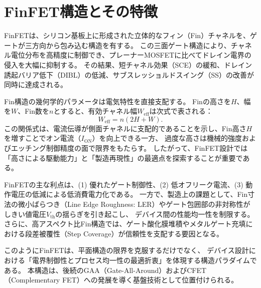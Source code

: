 \section{FinFET構造とその特徴}
FinFETは、シリコン基板上に形成された立体的なフィン（Fin）チャネルを、ゲートが三方向から包み込む構造を有する。  
この三面ゲート構造により、チャネル電位分布を高精度に制御でき、プレーナーMOSFETに比べてドレイン電界の侵入を大幅に抑制する。  
その結果、短チャネル効果（SCE）の緩和、ドレイン誘起バリア低下（DIBL）の低減、サブスレッショルドスイング（SS）の改善が同時に達成される。

Fin構造の幾何学的パラメータは電気特性を直接支配する。  
Finの高さを$H$、幅を$W$、Fin数を$n$とすると、有効チャネル幅$W_{\mathrm{eff}}$は次式で表される：
\begin{equation}
  W_{\mathrm{eff}} = n(2H + W).
\end{equation}
この関係式は、電流伝導が側面チャネルに支配的であることを示し、Fin高さ$H$を増すことでオン電流（$I_{\mathrm{ON}}$）を向上できる一方、  
過度な高さは機械的強度およびエッチング制御精度の面で限界をもたらす。  
したがって、FinFET設計では「高さによる駆動能力」と「製造再現性」の最適点を探索することが重要である。

FinFETの主な利点は、(1) 優れたゲート制御性、(2) 低オフリーク電流、(3) 動作電圧の低減による低消費電力化である。  
一方で、製造上の課題として、Fin寸法の微小ばらつき（Line Edge Roughness: LER）やゲート包囲部の非対称性がしきい値電圧$V_{\mathrm{th}}$の揺らぎを引き起こし、  
デバイス間の性能均一性を制限する。  
さらに、高アスペクト比Fin構造では、ゲート酸化膜堆積やメタルゲート充填における段差被覆性（Step Coverage）が信頼性を支配する要因となる。

このようにFinFETは、平面構造の限界を克服するだけでなく、  
デバイス設計における「電界制御性とプロセス均一性の最適折衷」を体現する構造パラダイムである。  
本構造は、後続のGAA（Gate-All-Around）およびCFET（Complementary FET）への発展を導く基盤技術として位置付けられる。



